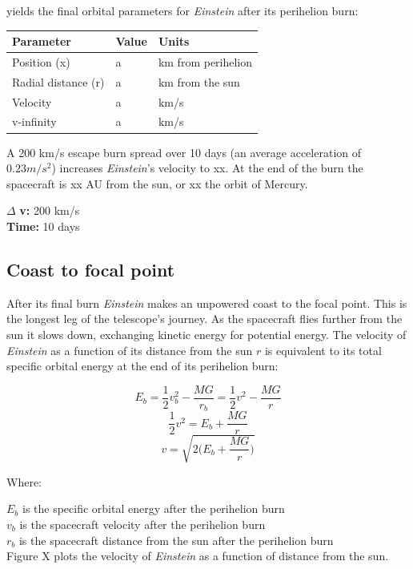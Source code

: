 \documentclass[12pt]{article} %
\begin{document}
yields the final orbital parameters for \textit{Einstein} after its perihelion burn:

\begin{center}
\begin{tabular}{|m{5 cm}| m{5 cm}| m{5 cm}|} \hline
\textbf{Parameter} & \textbf{Value} & \textbf{Units}\\ \hline
Position (x) & a& km from perihelion\\ \hline
Radial distance (r) & a& km from the sun\\ \hline
Velocity      &  a& km/s\\ \hline
v-infinity     &  a& km/s\\ \hline
\end{tabular}
\end{center}

A 200 km/s escape burn spread over 10 days (an average acceleration of $0.23m/s^2$) increases \textit{Einstein}'s velocity to xx. At the end of the burn the spacecraft is xx AU from the sun, or xx the orbit of Mercury.


$\Delta$ \textbf{v:} 200 km/s\\
\textbf{Time:} 10 days\\

\subsection{Coast to focal point}
After its final burn \textit{Einstein} makes an unpowered coast to the focal point. This is the longest leg of the telescope's journey. As the spacecraft flies further from the sun it slows down, exchanging kinetic energy for potential energy. The velocity of \textit{Einstein} as a function of its distance from the sun $r$ is equivalent to its total specific orbital energy at the end of its perihelion burn:

$$E_{b} = \frac{1}{2}v_b^2 - \frac{MG}{r_b} = \frac{1}{2}v^2-\frac{MG}{r}$$
$$\frac{1}{2}v^2 = E_b+\frac{MG}{r}$$
$$\boxed{v = \sqrt{2\big(E_b + \frac{MG}{r}\big)}}$$

Where:

$E_b$ is the specific orbital energy after the perihelion burn\\
$v_b$ is the spacecraft velocity after the perihelion burn\\
$r_b$ is the spacecraft distance from the sun after the perihelion burn\\

Figure X plots the velocity of \textit{Einstein} as a function of distance from the sun.
\end{document}
